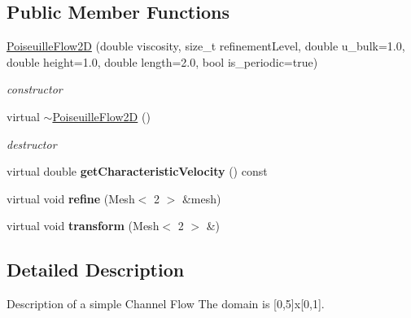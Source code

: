 \subsection*{Public Member Functions}
\begin{DoxyCompactItemize}
\item 
\hyperlink{classnatrium_1_1PoiseuilleFlow2D_a377e6996a9b45552b9a56aa96d0325ee}{PoiseuilleFlow2D} (double viscosity, size\_\-t refinementLevel, double u\_\-bulk=1.0, double height=1.0, double length=2.0, bool is\_\-periodic=true)
\begin{DoxyCompactList}\small\item\em constructor \item\end{DoxyCompactList}\item 
\hypertarget{classnatrium_1_1PoiseuilleFlow2D_a62f9e7cfb2e32753b58eafb9d5936fd4}{
virtual \hyperlink{classnatrium_1_1PoiseuilleFlow2D_a62f9e7cfb2e32753b58eafb9d5936fd4}{$\sim$PoiseuilleFlow2D} ()}
\label{classnatrium_1_1PoiseuilleFlow2D_a62f9e7cfb2e32753b58eafb9d5936fd4}

\begin{DoxyCompactList}\small\item\em destructor \item\end{DoxyCompactList}\item 
\hypertarget{classnatrium_1_1PoiseuilleFlow2D_ae3c247688d49d23a5b0940e22f795309}{
virtual double {\bfseries getCharacteristicVelocity} () const }
\label{classnatrium_1_1PoiseuilleFlow2D_ae3c247688d49d23a5b0940e22f795309}

\item 
\hypertarget{classnatrium_1_1PoiseuilleFlow2D_a4c65eee9fd6a2e13f53dd6332f7707c2}{
virtual void {\bfseries refine} (Mesh$<$ 2 $>$ \&mesh)}
\label{classnatrium_1_1PoiseuilleFlow2D_a4c65eee9fd6a2e13f53dd6332f7707c2}

\item 
\hypertarget{classnatrium_1_1PoiseuilleFlow2D_ac1b836d6a4689d7e0b2fb3a9fb1cfd80}{
virtual void {\bfseries transform} (Mesh$<$ 2 $>$ \&)}
\label{classnatrium_1_1PoiseuilleFlow2D_ac1b836d6a4689d7e0b2fb3a9fb1cfd80}

\end{DoxyCompactItemize}


\subsection{Detailed Description}
Description of a simple Channel Flow The domain is \mbox{[}0,5\mbox{]}x\mbox{[}0,1\mbox{]}. 

